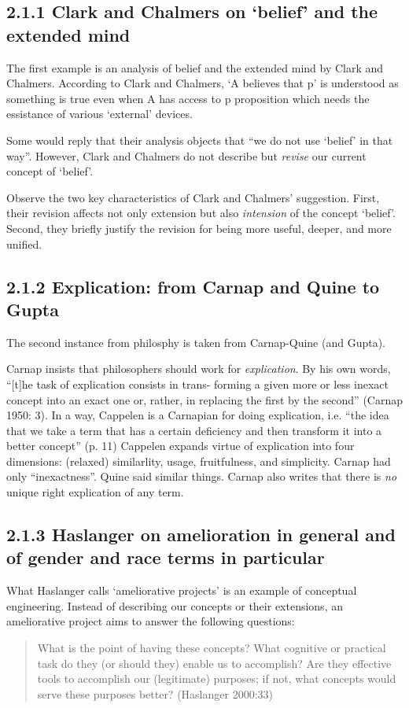 \documentclass[
10pt, %
a4paper, %
twocolumn, %
landscape %
]{article}
\begin{document}
\subsection*{2.1.1 Clark and Chalmers on `belief' and the extended mind}
The first example is an analysis of belief and the extended mind by Clark and Chalmers.
According to Clark and Chalmers,  `A believes that p' is understood as something is true even when A has access to p proposition which needs the essistance of various `external' devices.

Some would reply that their analysis objects that ``we do not use `belief' in that way''.
However, Clark and Chalmers do not describe but \emph{revise} our current concept of `belief'.

Observe the two key characteristics of Clark and Chalmers' suggestion.
First, their revision affects not only extension but also \emph{intension} of the concept `belief'.
Second, they briefly justify the revision for being more useful, deeper, and more unified.

\subsection*{2.1.2 Explication: from Carnap and Quine to Gupta}

The second instance from philosphy is taken from Carnap-Quine (and Gupta).

Carnap insists that philosophers should work for \emph{explication}.
By his own words, ``[t]he task of explication consists in trans- forming a given more or less inexact concept into an exact one or, rather, in replacing the first by the second'' (Carnap 1950: 3).
In a way, Cappelen is a Carnapian for doing explication, i.e. ``the idea that we take a term that has a certain deficiency and then transform it into a better concept'' (p. 11)
Cappelen expands virtue of explication into four dimensions: (relaxed) similarlity, usage, fruitfulness, and simplicity. Carnap had only ``inexactness''.
Quine said similar things.
Carnap also writes that there is \emph{no} unique right explication of any term.

\subsection*{2.1.3 Haslanger on amelioration in general and of gender and race terms in particular}
What Haslanger calls `ameliorative projects' is an example of conceptual engineering. Instead of describing our concepts or their extensions, an ameliorative project aims to answer the following questions:
\begin{quote}
  What is the point of having these concepts? What cognitive or practical task do they (or should they) enable us to accomplish? Are they effective tools to accomplish our (legitimate) purposes; if not, what concepts would serve these purposes better? (Haslanger 2000:33)
\end{quote}
\end{document}
